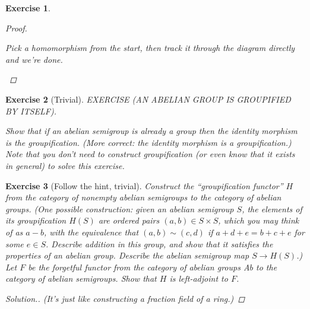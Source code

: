 \documentclass{article}
\theoremstyle{breakstyle}
\newtheorem{exercise}{Exercise}[section]
\newenvironment{solution}
  {\begin{proof}[Solution.]\renewcommand{\qedsymbol}{}}
  {\end{proof}}
\begin{document}
\begin{exercise}
\begin{proof}
\begin{enumerate}[label=({\Roman*})]
            Pick a homomorphism from the start, then track it through the
            diagram directly and we're done.
    \end{enumerate}
\end{proof}

\end{exercise}

\begin{exercise}[Trivial]
EXERCISE (AN ABELIAN GROUP IS GROUPIFIED BY ITSELF).

Show that if an abelian semigroup is already a group then the identity
morphism is the groupification. (More correct: the identity morphism is a
groupification.) Note that you don't need to construct groupification (or
even know that it exists in general) to solve this exercise.
\end{exercise}

\begin{exercise}[Follow the hint, trivial]
Construct the ``groupification functor'' $H$ from the category of nonempty
abelian semigroups to the category of abelian groups. (One possible
construction: given an abelian semigroup $S$, the elements of its
groupification $H(S)$ are ordered pairs $(a, b) \in S \times S$, which you
may think of as $a - b$, with the equivalence that $(a, b) \sim (c, d)$ if
$a + d + e = b + c + e$ for some $e \in S$. Describe addition in this
group, and show that it satisfies the properties of an abelian group.
Describe the abelian semigroup map $S \to H(S)$.) Let $F$ be the forgetful
functor from the category of abelian groups Ab to the category of abelian
semigroups. Show that $H$ is left-adjoint to $F$.

\begin{solution}
    \emph{(It's just like constructing a fraction field of a ring.)}
\end{solution}

\end{exercise}
\end{document}
